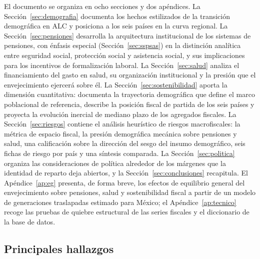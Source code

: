\documentclass[12pt, letterpaper]{article}
\begin{document}
El documento se organiza en ocho secciones y dos apéndices. La
Sección~\ref{sec:demografia} documenta los hechos estilizados de la transición
demográfica en ALC y posiciona a los seis países en la curva regional. La
Sección~\ref{sec:pensiones} desarrolla la arquitectura institucional de los
sistemas de pensiones, con énfasis especial (Sección~\ref{sec:sspsas}) en la
distinción analítica entre seguridad social, protección social y asistencia
social, y sus implicaciones para los incentivos de formalización laboral. La
Sección~\ref{sec:salud} analiza el financiamiento del gasto en salud, su
organización institucional y la presión que el envejecimiento ejercerá sobre él.
La Sección~\ref{sec:sostenibilidad} aporta la dimensión cuantitativa: documenta la
trayectoria demográfica que define el marco poblacional de referencia, describe la
posición fiscal de partida de los seis países y proyecta la evolución inercial de
mediano plazo de los agregados fiscales. La Sección~\ref{sec:riesgos} contiene el
análisis heurístico de riesgos macrofiscales: la métrica de espacio fiscal, la
presión demográfica mecánica sobre pensiones y salud, una calificación sobre la
dirección del sesgo del insumo demográfico, seis fichas de riesgo por país y una
síntesis comparada. La Sección~\ref{sec:politica} organiza las consideraciones de
política alrededor de los márgenes que la identidad de reparto deja abiertos, y la
Sección~\ref{sec:conclusiones} recapitula. El Apéndice~\ref{ap:eg} presenta, de
forma breve, los efectos de equilibrio general del envejecimiento sobre pensiones,
salud y sostenibilidad fiscal a partir de un modelo de generaciones traslapadas
estimado para México; el Apéndice~\ref{ap:tecnico} recoge las pruebas de quiebre
estructural de las series fiscales y el diccionario de la base de datos.

\subsection{Principales hallazgos}
\label{sec:hallazgos}
\end{document}
